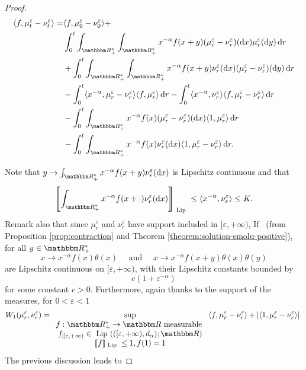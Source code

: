 \documentclass[a4paper,11pt, reqno]{amsart}
\newcommand{\eps}{\varepsilon}
\newcommand{\dd}{\mathop{}\!\mathrm{d}}
\newcommand{\1}{\mathbbm{1}}
\theoremstyle{plain}
\theoremstyle{definition}
\begin{document}
\begin{proof}
  \begin{align*}
    \langle f, \mu^{\eps}_t - \nu^{\eps}_t \rangle = & \langle
    f, \mu^{\eps}_0 - \nu_0^{\eps} \rangle +\\
    & \int_0^t \int_{\RR^{\ast}_+} \int_{\RR^{\ast}_+} x^{-
    \alpha} f (x + y) (\mu_r^{\eps} - \nu^{\eps}_r) (\dd x)
    \mu_r^{\eps} (\dd y) \dd r\\
    & + \int_0^t \int_{\RR^{\ast}_+} \int_{\RR^{\ast}_+} x^{-
    \alpha} f (x + y) \nu_r^{\eps} (\dd x) (\mu_r^{\eps} -
    \nu^{\eps}_r) (\dd y) \dd r\\
    & - \int_0^t \langle x^{- \alpha}, \mu^{\eps}_r -
    \nu^{\eps}_r \rangle \langle f, \mu_r^{\eps} \rangle \dd
    r - \int_0^t \langle x^{- \alpha}, \nu^{\eps}_r \rangle \langle f,
    \mu_r^{\eps} - \nu^{\eps}_r \rangle \dd r\\
    & - \int_0^t \int_{\RR^{\ast}_+} x^{- \alpha} f (x)
    (\mu_r^{\eps} - \nu^{\eps}_r) (\dd x) \langle 1,
    \mu_r^{\eps} \rangle \dd r\\
    & - \int_0^t \int_{\RR^{\ast}_+} x^{- \alpha} f (x)
    \nu_r^{\eps} (\dd x) \langle 1, \mu_r^{\eps} -
    \nu^{\eps}_r \rangle \dd r.
  \end{align*}
  
  Note that $y \rightarrow \int_{\RR^{\ast}_+} x^{- \alpha} f (x + y)
  \nu_r^{\eps} (\dd x)$ is Lipschitz continuous and that
  \[ \left\llbracket \int_{\RR^{\ast}_+} x^{- \alpha} f (x + \cdot)
     \nu_r^{\eps} (\dd x) \right\rrbracket_{ \text{ Lip } } \le
     \langle x^{- \alpha}, \nu^{\eps}_r \rangle \le K. \]
  Remark also that since $\mu^{\eps}_r$ and $\nu^{\eps}_r$ have
  support included in $[\eps, + \infty)$, If \ (from Proposition
  \ref{prop:contraction} and Theorem \ref{theorem:solution-smolu-positive}),
  for all $y \in \RR_+^{\ast}$
  \[ x \rightarrow x^{- \alpha} f (x) \theta (x) \quad  \text{ and } \quad x
     \rightarrow x^{- \alpha} f (x + y) \theta (x) \theta (y) \]
  are Lipschitz continuous on $[\eps, + \infty)$, with their Lipschitz
  constants bounded by
  \[ c (1 + \eps^{- \alpha}) \]
  for some constant $c > 0$. Furthermore, again thanks to the support of the
  measures, for $0 < \eps < 1$
  \[ W_1 (\mu^{\eps}_r, \nu^{\eps}_r) =
     \underset{\begin{array}{c}
       f : \RR_+^{\ast} \rightarrow \RR  \text{ measurable } \\
       f_{| [\eps, + \infty)} \in  \text{ Lip } (([\eps, + \infty),
       d_{\alpha}) ; \RR)\\
       \llbracket f \rrbracket_{ \text{ Lip } } \le 1, f (1) = 1
     \end{array}}{\sup} \langle f, \mu^{\eps}_r - \nu^{\eps}_r
     \rangle + | \langle 1, \mu^{\eps}_r - \nu^{\eps}_r \rangle
     | . \]
  The previous discussion leads to
  

\end{proof}
\end{document}
